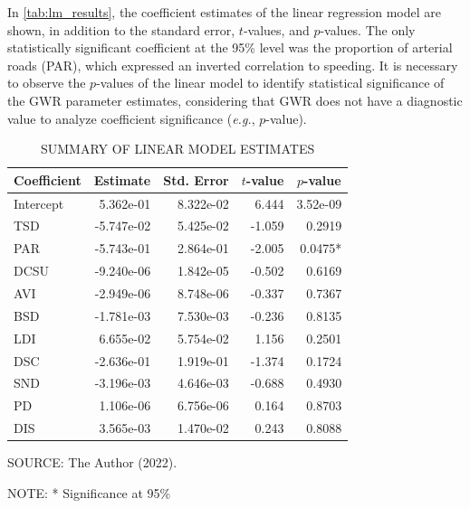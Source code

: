 In \autoref{tab:lm_results}, the coefficient estimates of the linear regression model are shown, in addition to the standard error, $t$-values, and $p$-values. The only statistically significant coefficient at the 95\% level was the proportion of arterial roads (PAR), which expressed an inverted correlation to speeding. It is necessary to observe the $p$-values of the linear model to identify statistical significance of the GWR parameter estimates, considering that GWR does not have a diagnostic value to analyze coefficient significance (\textit{e.g.}, $p$-value). 


\begin{table}[!htbp]
    \footnotesize
    \captionsetup{justification=raggedright,
        singlelinecheck=false,
        font=footnotesize}
    \caption{SUMMARY OF LINEAR MODEL ESTIMATES}
    \centering
    \begin{tabular}{lrrrr}
        \hline
        \multicolumn{1}{c}{\textbf{Coefficient}} & \multicolumn{1}{c}{\textbf{Estimate}} & \multicolumn{1}{c}{\textbf{Std. Error}} & \multicolumn{1}{c}{\textbf{$t$-value}} & \multicolumn{1}{c}{\textbf{$p$-value}}  \\
        \hline
        Intercept  &  5.362e-01 & 8.322e-02 &  6.444 &  3.52e-09 \\
        TSD        & -5.747e-02 & 5.425e-02 & -1.059 &  0.2919   \\
        PAR        & -5.743e-01 & 2.864e-01 & -2.005 &  0.0475*  \\ 
        DCSU       & -9.240e-06 & 1.842e-05 & -0.502 &  0.6169   \\ 
        AVI        & -2.949e-06 & 8.748e-06 & -0.337 &  0.7367   \\ 
        BSD        & -1.781e-03 & 7.530e-03 & -0.236 &  0.8135   \\ 
        LDI        &  6.655e-02 & 5.754e-02 &  1.156 &  0.2501   \\ 
        DSC        & -2.636e-01 & 1.919e-01 & -1.374 &  0.1724   \\ 
        SND        & -3.196e-03 & 4.646e-03 & -0.688 &  0.4930   \\ 
        PD         &  1.106e-06 & 6.756e-06 &  0.164 &  0.8703   \\ 
        DIS        &  3.565e-03 & 1.470e-02 &  0.243 &  0.8088   \\ 
        \hline
    \end{tabular}
    \label{tab:lm_results}
    \par \vspace{2mm} \footnotesize \raggedright
    SOURCE: The Author (2022).
    \par 
    NOTE: * Significance at 95\%
\end{table}

